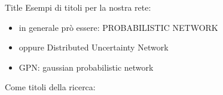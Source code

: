 \begin{projsection}{Title}
	Esempi di titoli per la nostra rete:
	\begin{itemize}
		\item in generale prò essere: PROBABILISTIC NETWORK
		\item oppure Distributed Uncertainty Network
		\item GPN: gaussian probabilistic network 
	\end{itemize}
	
	Come titoli della ricerca:
	
\end{projsection}